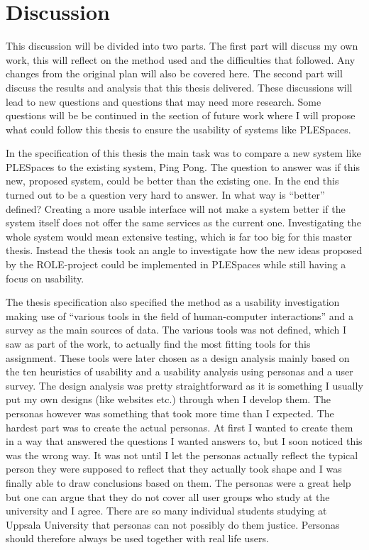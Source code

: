 \section {Discussion}

This discussion will be divided into two parts. The first part will discuss my own work, this will reflect on the method used and the difficulties that followed. Any changes from the original plan will also be covered here. The second part will discuss the results and analysis that this thesis delivered. These discussions will lead to new questions and questions that may need more research. Some questions will be be continued in the section of future work where I will propose what could follow this thesis to ensure the usability of systems like PLESpaces.

In the specification of this thesis the main task was to compare a new system like PLESpaces to the existing system, Ping Pong. The question to answer was if this new, proposed system, could be better than the existing one. In the end this turned out to be a question very hard to answer. In what way is “better” defined? Creating a more usable interface will not make a system better if the system itself does not offer the same services as the current one. Investigating the whole system would mean extensive testing, which is far too big for this master thesis. Instead the thesis took an angle to investigate how the new ideas proposed by the ROLE-project could be implemented in PLESpaces while still having a focus on usability.

The thesis specification also specified the method as a usability investigation making use of “various tools in the field of human-computer interactions” and a survey as the main sources of data. The various tools was not defined, which I saw as part of the work, to actually find the most fitting tools for this assignment. These tools were later chosen as a design analysis mainly based on the ten heuristics of usability and a usability analysis using personas and a user survey. The design analysis was pretty straightforward as it is something I usually put my own designs (like websites etc.) through when I develop them. The personas however was something that took more time than I expected. The hardest part was to create the actual personas. At first I wanted to create them in a way that answered the questions I wanted answers to, but I soon noticed this was the wrong way. It was not until I let the personas actually reflect the typical person they were supposed to reflect that they actually took shape and I was finally able to draw conclusions based on them. The personas were a great help but one can argue that they do not cover all user groups who study at the university and I agree. There are so many individual students studying at Uppsala University that personas can not possibly do them justice. Personas should therefore always be used together with real life users.

